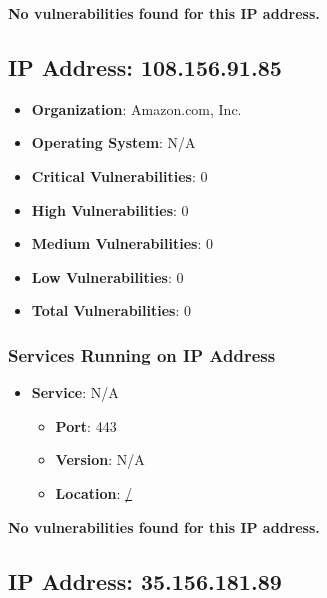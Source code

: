 \documentclass{article}
\begin{document}
\textbf{No vulnerabilities found for this IP address.}




\clearpage



\subsection{IP Address: 108.156.91.85}

\begin{itemize}
    \item \textbf{Organization}: Amazon.com, Inc.
    \item \textbf{Operating System}:  N/A 
    \item \textbf{Critical Vulnerabilities}: 0
    \item \textbf{High Vulnerabilities}: 0
    \item \textbf{Medium Vulnerabilities}: 0
    \item \textbf{Low Vulnerabilities}: 0
    \item \textbf{Total Vulnerabilities}: 0
\end{itemize}

\subsubsection*{Services Running on IP Address}

\begin{itemize}
    
        \item \textbf{Service}: N/A
        \begin{itemize}
            \item \textbf{Port}: 443
            \item \textbf{Version}:  N/A 
            \item \textbf{Location}: \href{ / }{ / }
        \end{itemize}
    
\end{itemize}


\textbf{No vulnerabilities found for this IP address.}




\clearpage



\subsection{IP Address: 35.156.181.89}
\end{document}
